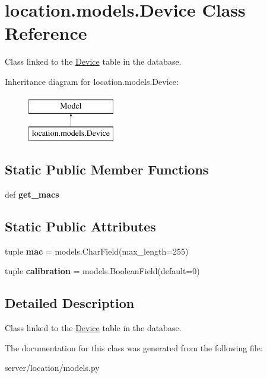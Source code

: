 \hypertarget{classlocation_1_1models_1_1Device}{\section{location.\-models.\-Device Class Reference}
\label{classlocation_1_1models_1_1Device}
}


Class linked to the \hyperlink{classlocation_1_1models_1_1Device}{Device} table in the database.  


Inheritance diagram for location.\-models.\-Device\-:\begin{figure}[H]
\begin{center}
\leavevmode
\includegraphics[height=2.000000cm]{classlocation_1_1models_1_1Device}
\end{center}
\end{figure}
\subsection*{Static Public Member Functions}
\begin{DoxyCompactItemize}
\item 
\hypertarget{classlocation_1_1models_1_1Device_a45fa946e37903d6515ec4b2237e7e429}{def {\bfseries get\-\_\-macs}}\label{classlocation_1_1models_1_1Device_a45fa946e37903d6515ec4b2237e7e429}

\end{DoxyCompactItemize}
\subsection*{Static Public Attributes}
\begin{DoxyCompactItemize}
\item 
\hypertarget{classlocation_1_1models_1_1Device_af0b3482b70bc9eefc334a1a211dddb02}{tuple {\bfseries mac} = models.\-Char\-Field(max\-\_\-length=255)}\label{classlocation_1_1models_1_1Device_af0b3482b70bc9eefc334a1a211dddb02}

\item 
\hypertarget{classlocation_1_1models_1_1Device_a89ef52d772d03025f287453bb8e39e43}{tuple {\bfseries calibration} = models.\-Boolean\-Field(default=0)}\label{classlocation_1_1models_1_1Device_a89ef52d772d03025f287453bb8e39e43}

\end{DoxyCompactItemize}


\subsection{Detailed Description}
Class linked to the \hyperlink{classlocation_1_1models_1_1Device}{Device} table in the database. 

The documentation for this class was generated from the following file\-:\begin{DoxyCompactItemize}
\item 
server/location/models.\-py\end{DoxyCompactItemize}
